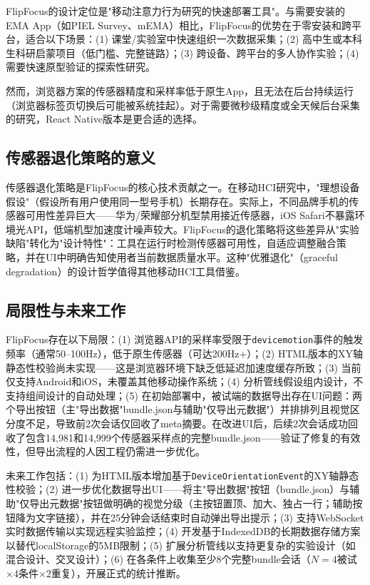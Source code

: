 \documentclass[12pt,a4paper]{ctexart}
\begin{document}
FlipFocus的设计定位是"移动注意力行为研究的快速部署工具"。与需要安装的EMA App（如PIEL Survey、mEMA）相比，FlipFocus的优势在于零安装和跨平台，适合以下场景：(1) 课堂/实验室中快速组织一次数据采集；(2) 高中生或本科生科研启蒙项目（低门槛、完整链路）；(3) 跨设备、跨平台的多人协作实验；(4) 需要快速原型验证的探索性研究。

然而，浏览器方案的传感器精度和采样率低于原生App，且无法在后台持续运行（浏览器标签页切换后可能被系统挂起）。对于需要微秒级精度或全天候后台采集的研究，React Native版本是更合适的选择。

\subsection{传感器退化策略的意义}

传感器退化策略是FlipFocus的核心技术贡献之一。在移动HCI研究中，"理想设备假设"（假设所有用户使用同一型号手机）长期存在\cite{wac2016smartphone}。实际上，不同品牌手机的传感器可用性差异巨大——华为/荣耀部分机型禁用接近传感器，iOS Safari不暴露环境光API，低端机型加速度计噪声较大。FlipFocus的退化策略将这些差异从"实验缺陷"转化为"设计特性"：工具在运行时检测传感器可用性，自适应调整融合策略，并在UI中明确告知使用者当前数据质量水平。这种"优雅退化"（graceful degradation）的设计哲学值得其他移动HCI工具借鉴。

\subsection{局限性与未来工作}

FlipFocus存在以下局限：(1) 浏览器API的采样率受限于\texttt{devicemotion}事件的触发频率（通常50--100Hz），低于原生传感器（可达200Hz+）；(2) HTML版本的XY轴静态性校验尚未实现——这是浏览器环境下缺乏低延迟加速度缓存所致；(3) 当前仅支持Android和iOS，未覆盖其他移动操作系统；(4) 分析管线假设组内设计，不支持组间设计的自动处理；(5) 在初始部署中，被试端的数据导出存在UI问题：两个导出按钮（主"导出数据"bundle.json与辅助"仅导出元数据"）并排排列且视觉区分度不足，导致前2次会话仅回收了meta摘要。在改进UI后，后续2次会话成功回收了包含14,981和14,999个传感器采样点的完整bundle.json——验证了修复的有效性，但导出流程的人因工程仍需进一步优化。

未来工作包括：(1) 为HTML版本增加基于\texttt{DeviceOrientationEvent}的XY轴静态性校验；(2) 进一步优化数据导出UI——将主"导出数据"按钮（bundle.json）与辅助"仅导出元数据"按钮做明确的视觉分级（主按钮置顶、加大、独占一行；辅助按钮降为文字链接），并在25分钟会话结束时自动弹出导出提示；(3) 支持WebSocket实时数据传输以实现远程实验监控；(4) 开发基于IndexedDB的长期数据存储方案以替代localStorage的5MB限制；(5) 扩展分析管线以支持更复杂的实验设计（如混合设计、交叉设计）；(6) 在各条件上收集至少8个完整bundle会话（$N=4$被试$\times 4$条件$\times 2$重复），开展正式的统计推断。
\end{document}
